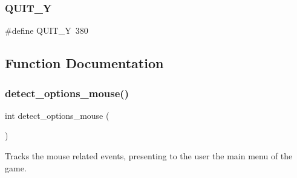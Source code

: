 \mbox{\label{group__main__menu_gae60f4142599ff024b4d8d2ca3ebe42e7}} 
\subsubsection{\texorpdfstring{Q\+U\+I\+T\+\_\+Y}{QUIT\_Y}}
{\footnotesize\ttfamily \#define Q\+U\+I\+T\+\_\+Y~380}



\subsection{Function Documentation}
\mbox{\label{group__main__menu_gadf0b351e14ba0cb60a8d69e8b4423e68}} 
\subsubsection{\texorpdfstring{detect\+\_\+options\+\_\+mouse()}{detect\_options\_mouse()}}
{\footnotesize\ttfamily int detect\+\_\+options\+\_\+mouse (\begin{DoxyParamCaption}{ }\end{DoxyParamCaption})}



Tracks the mouse related events, presenting to the user the main menu of the game. 

